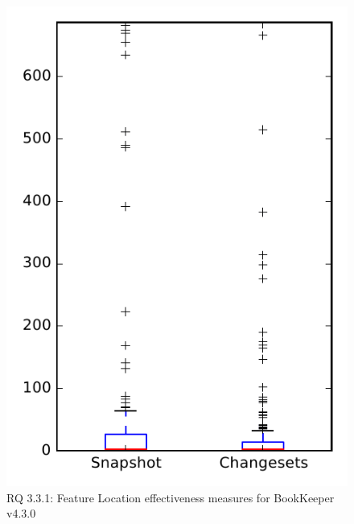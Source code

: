 
\begin{figure}
\centering
\includegraphics[height=0.4\textheight]{figures/flt_seed/rq1_bookkeeper}
\caption{RQ 3.3.1: Feature Location effectiveness measures for BookKeeper v4.3.0}
\label{fig:flt_seed:rq1:bookkeeper}
\end{figure}
